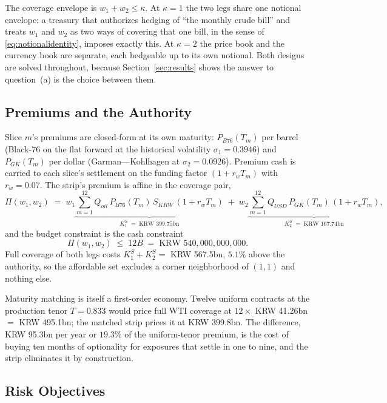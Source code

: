\documentclass[11pt,a4paper]{article}
\begin{document}
The coverage envelope is $w_1+w_2\le\kappa$. At $\kappa=1$ the two legs share one notional envelope: a treasury that authorizes hedging of ``the monthly crude bill'' and treats $w_1$ and $w_2$ as two ways of covering that one bill, in the sense of \eqref{eq:notionalidentity}, imposes exactly this. At $\kappa=2$ the price book and the currency book are separate, each hedgeable up to its own notional. Both designs are solved throughout, because Section~\ref{sec:results} shows the answer to question~(a) is the choice between them.

\subsection{Premiums and the Authority}
\label{sec:cost}

Slice $m$'s premiums are closed-form at its own maturity: $P_{B76}(T_m)$ per barrel (Black-76 on the flat forward at the historical volatility $\sigma_1=0.3946$) and $P_{GK}(T_m)$ per dollar (Garman---Kohlhagen at $\sigma_2=0.0926$). Premium cash is carried to each slice's settlement on the funding factor $(1+r_w T_m)$ with $r_w=0.07$. The strip's premium is affine in the coverage pair,
\begin{equation}
\Pi(w_1,w_2) \;=\; w_1\underbrace{\sum_{m=1}^{12} Q_{oil}\,P_{B76}(T_m)\,S_{KRW}\,(1+r_wT_m)}_{K_1^S\;=\;\text{KRW 399.75bn}}
\;+\; w_2\underbrace{\sum_{m=1}^{12} Q_{USD}\,P_{GK}(T_m)\,(1+r_wT_m)}_{K_2^S\;=\;\text{KRW 167.74bn}},
\label{eq:strippremium}
\end{equation}
and the budget constraint is the cash constraint
\begin{equation}
\Pi(w_1,w_2)\;\le\;12B\;=\;\text{KRW }540{,}000{,}000{,}000.
\label{eq:authority}
\end{equation}
Full coverage of both legs costs $K_1^S+K_2^S=$ KRW 567.5bn, $5.1\%$ above the authority, so the affordable set excludes a corner neighborhood of $(1,1)$ and nothing else.

Maturity matching is itself a first-order economy. Twelve uniform contracts at the production tenor $T=0.833$ would price full WTI coverage at $12\times$ KRW 41.26bn $=$ KRW 495.1bn; the matched strip prices it at KRW 399.8bn. The difference, KRW 95.3bn per year or $19.3\%$ of the uniform-tenor premium, is the cost of buying ten months of optionality for exposures that settle in one to nine, and the strip eliminates it by construction.

\subsection{Risk Objectives}
\label{sec:objectives}
\end{document}
